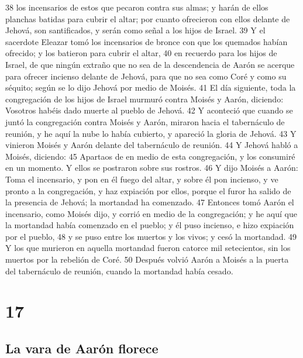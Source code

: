 38 los incensarios de estos que pecaron contra sus almas; y harán de ellos planchas batidas para cubrir el altar; por cuanto ofrecieron con ellos delante de Jehová, son santificados, y serán como señal a los hijos de Israel.
39 Y el sacerdote Eleazar tomó los incensarios de bronce con que los quemados habían ofrecido; y los batieron para cubrir el altar,
40 en recuerdo para los hijos de Israel, de que ningún extraño que no sea de la descendencia de Aarón se acerque para ofrecer incienso delante de Jehová, para que no sea como Coré y como su séquito; según se lo dijo Jehová por medio de Moisés.
41 El día siguiente, toda la congregación de los hijos de Israel murmuró contra Moisés y Aarón, diciendo: Vosotros habéis dado muerte al pueblo de Jehová.
42 Y aconteció que cuando se juntó la congregación contra Moisés y Aarón, miraron hacia el tabernáculo de reunión, y he aquí la nube lo había cubierto, y apareció la gloria de Jehová.
43 Y vinieron Moisés y Aarón delante del tabernáculo de reunión.
44 Y Jehová habló a Moisés, diciendo:
45 Apartaos de en medio de esta congregación, y los consumiré en un momento. Y ellos se postraron sobre sus rostros.
46 Y dijo Moisés a Aarón: Toma el incensario, y pon en él fuego del altar, y sobre él pon incienso, y ve pronto a la congregación, y haz expiación por ellos, porque el furor ha salido de la presencia de Jehová; la mortandad ha comenzado.
47 Entonces tomó Aarón el incensario, como Moisés dijo, y corrió en medio de la congregación; y he aquí que la mortandad había comenzado en el pueblo; y él puso incienso, e hizo expiación por el pueblo,
48 y se puso entre los muertos y los vivos; y cesó la mortandad.
49 Y los que murieron en aquella mortandad fueron catorce mil setecientos, sin los muertos por la rebelión de Coré.
50 Después volvió Aarón a Moisés a la puerta del tabernáculo de reunión, cuando la mortandad había cesado.

\chapter{17}

\section*{La vara de Aarón florece}

